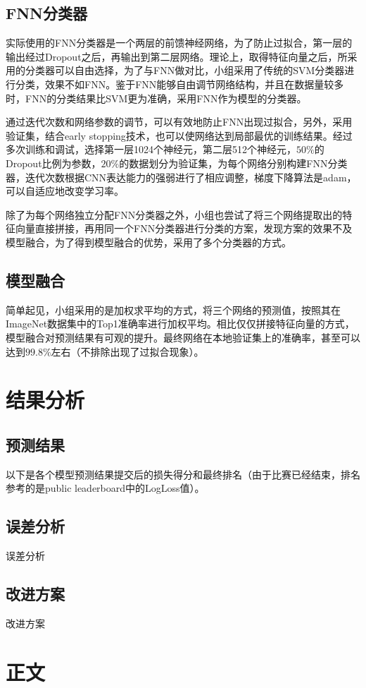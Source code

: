 \documentclass[10.5pt,twocolumn]{jbuaa}
\begin{document}
\subsection{FNN分类器}
实际使用的FNN分类器是一个两层的前馈神经网络，为了防止过拟合，第一层的输出经过Dropout之后，再输出到第二层网络。理论上，取得特征向量之后，所采用的分类器可以自由选择，为了与FNN做对比，小组采用了传统的SVM分类器进行分类，效果不如FNN。鉴于FNN能够自由调节网络结构，并且在数据量较多时，FNN的分类结果比SVM更为准确，采用FNN作为模型的分类器。

通过迭代次数和网络参数的调节，可以有效地防止FNN出现过拟合，另外，采用验证集，结合early stopping技术，也可以使网络达到局部最优的训练结果。经过多次训练和调试，选择第一层1024个神经元，第二层512个神经元，$50\%$的Dropout比例为参数，$20\%$的数据划分为验证集，为每个网络分别构建FNN分类器，迭代次数根据CNN表达能力的强弱进行了相应调整，梯度下降算法是adam，可以自适应地改变学习率。

除了为每个网络独立分配FNN分类器之外，小组也尝试了将三个网络提取出的特征向量直接拼接，再用同一个FNN分类器进行分类的方案，发现方案的效果不及模型融合，为了得到模型融合的优势，采用了多个分类器的方式。
\subsection{模型融合}
简单起见，小组采用的是加权求平均的方式，将三个网络的预测值，按照其在ImageNet数据集中的Top1准确率进行加权平均。相比仅仅拼接特征向量的方式，模型融合对预测结果有可观的提升。最终网络在本地验证集上的准确率，甚至可以达到$99.8\%$左右（不排除出现了过拟合现象）。

\section{结果分析}
\subsection{预测结果}
以下是各个模型预测结果提交后的损失得分和最终排名（由于比赛已经结束，排名参考的是public leaderboard中的LogLoss值）。
\subsection{误差分析}
误差分析
\subsection{改进方案}
改进方案

\section{正文}
\end{document}
